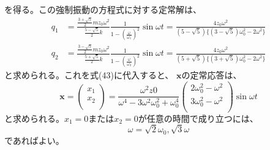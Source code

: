 \documentclass[a4paper]{jsarticle}
\begin{document}
を得る。この強制振動の方程式に対する定常解は、
\begin{equation}
  \begin{aligned}
    q_1 &= \frac{\frac{3 + \sqrt{5}}{2} m z_0 \omega^2}{\frac{5 - \sqrt{5}}{2} k}
    \frac{1}{1 - \left(\frac{\omega}{\omega_1}\right)^2} \sin \omega t
    = \frac{4 z_0 \omega^2}{(5 - \sqrt{5})\{(3 - \sqrt{5}) \omega_0^2 - 2 \omega^2\}} \\
    q_2 &= \frac{\frac{3 - \sqrt{5}}{2} m z_0 \omega^2}{\frac{5 + \sqrt{5}}{2} k}
    \frac{1}{1 - \left(\frac{\omega}{\omega_2}\right)^2} \sin \omega t
    = \frac{4 z_0 \omega^2}{(5 + \sqrt{5})\{(3 + \sqrt{5}) \omega_0^2 - 2 \omega^2\}}
  \end{aligned}
\end{equation}
と求められる。これを式(43)に代入すると、
$\boldsymbol{x}$の定常応答は、
\begin{equation}
  \boldsymbol{x} = 
  \begin{pmatrix}
    x_1 \\
    x_2 \\
  \end{pmatrix} =
  \frac{\omega^2  z0}{\omega^4 - 3 \omega^2 \omega_0^2 + \omega_0^4}
  \begin{pmatrix}
    2 \omega_0^2 - \omega^2 \\ 
    3 \omega_0^2 - \omega^2 \\
  \end{pmatrix}
  \sin \omega t
\end{equation}
と求められる。$x_1 = 0$または$x_2 = 0$が任意の時間で成り立つには、
\begin{equation}
  \omega = \sqrt{2} \omega_0, \sqrt{3} \omega
\end{equation}
であればよい。
\end{document}
